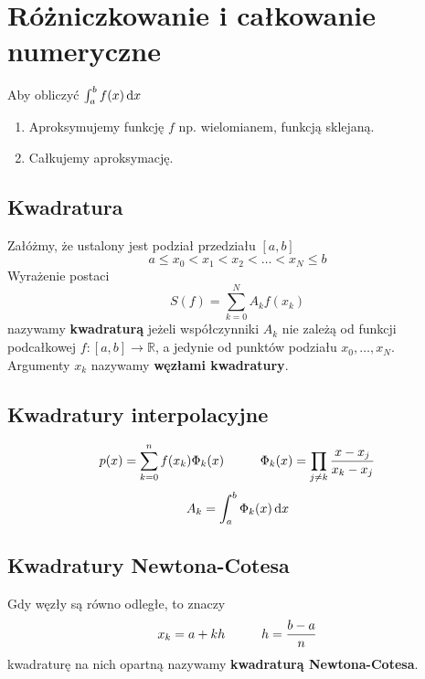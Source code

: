 \documentclass[../mn-notatki.tex]{subfiles}
\begin{document}
\section{Różniczkowanie i całkowanie numeryczne}

Aby obliczyć $\int_a^b f(x) \dif x$
\begin{enumerate}
    \item Aproksymujemy funkcję $f$ np. wielomianem, funkcją sklejaną.
    \item Całkujemy aproksymację.
\end{enumerate}

\subsection{Kwadratura}

\begin{tcolorbox}
Załóżmy, że ustalony jest podział przedziału $[a,b]$
\[
a \leqslant x_0 < x_1 < x_2 < \ldots < x_N \leqslant b
\]
Wyrażenie postaci
\[
S(f) = \sum_{k=0}^{N} A_k f(x_k)
\]
nazywamy \textbf{kwadraturą} jeżeli współczynniki $A_k$ nie zależą od funkcji
podcałkowej $f: [a,b] \rightarrow \mathbb{R}$, a jedynie od punktów podziału
$x_0, \ldots, x_N$.\\
Argumenty $x_k$ nazywamy \textbf{węzłami kwadratury}.
\end{tcolorbox}

\subsection{Kwadratury interpolacyjne}

\begin{tcolorbox}
\[
p(x) = \sum_{k=0}^n f(x_k)\Phi_k(x) \hspace*{1cm} \Phi_k(x) = \prod_{j \neq k}
\frac{x - x_j}{x_k - x_j}
\]
\[
A_k = \int_a^b \Phi_k(x) \dif x
\]
\end{tcolorbox}



\pagebreak
\subsection{Kwadratury Newtona-Cotesa}
Gdy węzły są równo odległe, to znaczy
\[
x_k = a + kh \hspace*{1cm} h = \frac{b-a}{n}
\]
kwadraturę na nich opartną nazywamy \textbf{kwadraturą Newtona-Cotesa}.
\end{document}

